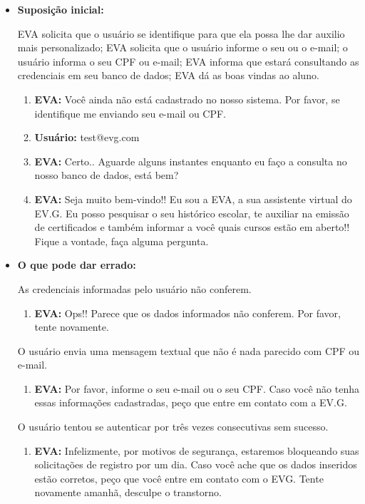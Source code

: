\begin{itemize}
    \item \textbf{Suposição inicial:} 
    
        EVA solicita que o usuário se identifique para que ela possa lhe dar auxilio mais personalizado; EVA solicita que o usuário informe o seu  ou o e-mail; o usuário informa o seu CPF ou e-mail; EVA informa que estará consultando as credenciais em seu banco de dados; EVA dá as boas vindas ao aluno.
        
        \begin{enumerate}
            \item \textbf{EVA:} Você ainda não está cadastrado no nosso sistema. Por favor, se identifique me enviando seu e-mail ou CPF.
            \item \textbf{Usuário:} test@evg.com
            \item \textbf{EVA:} Certo.. Aguarde alguns instantes enquanto eu faço a consulta no nosso banco de dados, está bem?
            \item \textbf{EVA:} Seja muito bem-vindo!! Eu sou a EVA, a sua assistente virtual do EV.G. Eu posso pesquisar o seu histórico escolar, te auxiliar na emissão de certificados e também informar a você quais cursos estão em aberto!! Fique a vontade, faça alguma pergunta.
        \end{enumerate}
    
    \item \textbf{O que pode dar errado:}
    
        As credenciais informadas pelo usuário não conferem.
        \begin{enumerate}
            \item \textbf{EVA:} Ops!! Parece que os dados informados não conferem. Por favor, tente novamente.
        \end{enumerate}
        
        O usuário envia uma mensagem textual que não é nada parecido com CPF ou e-mail.
        \begin{enumerate}
            \item \textbf{EVA:} Por favor, informe o seu e-mail ou o seu CPF. Caso você não tenha essas informações cadastradas, peço que entre em contato com a EV.G.
        \end{enumerate}
        
        O usuário tentou se autenticar por três vezes consecutivas sem sucesso.
        \begin{enumerate}
            \item \textbf{EVA:} Infelizmente, por motivos de segurança, estaremos bloqueando suas solicitações de registro por um dia. Caso você ache que os dados inseridos estão corretos, peço que você entre em contato com o EVG. Tente novamente amanhã, desculpe o transtorno.
        \end{enumerate}
        

\end{itemize}
